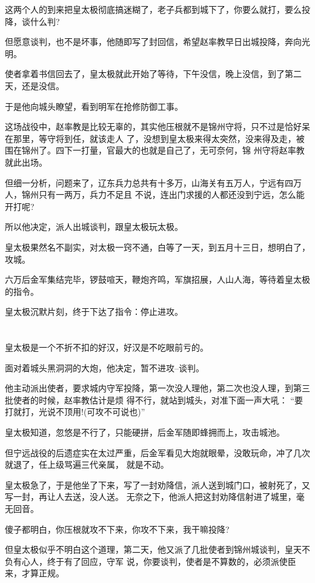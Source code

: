 \documentclass[11pt,a4paper,onecolumn]{article}
\begin{document}
这两个人的到来把皇太极彻底搞迷糊了，老子兵都到城下了，你要么就打，要么投降，谈什么判?

但愿意谈判，也不是坏事，他随即写了封回信，希望赵率教早日出城投降，奔向光明。

使者拿着书信回去了，皇太极就此开始了等待，下午没信，晚上没信，到了第二天，还是没信。

于是他向城头瞭望，看到明军在抢修防御工事。

这场战役中，赵率教是比较无辜的，其实他压根就不是锦州守将，只不过是恰好呆在那里，等守将到任，就该走人
了，没想到皇太极来得太突然，没来得及走，被围在锦州了。四下一打量，官最大的也就是自己了，无可奈何，锦
州守将赵率教就此出场。

但细一分析，问题来了，辽东兵力总共有十多万，山海关有五万人，宁远有四万人，锦州只有一两万，兵力不足且
不说，连出门求援的人都还没到宁远，怎么能开打呢?

所以他决定，派人出城谈判，跟皇太极玩太极。

皇太极果然名不副实，对太极一窍不通，白等了一天，到五月十三日，想明白了，攻城。

六万后金军集结完毕，锣鼓喧天，鞭炮齐鸣，军旗招展，人山人海，等待着皇太极的指令。

皇太极沉默片刻，终于下达了指令：停止进攻。

\section[\thesection]{}

皇太极是一个不折不扣的好汉，好汉是不吃眼前亏的。

面对着城头黑洞洞的大炮，他决定，暂不进攻--谈判。

他主动派出使者，要求城内守军投降，第一次没人理他，第二次也没人理，到第三批使者的时候，赵率教估计是烦
得不行，就站到城头，对准下面一声大吼： ``要打就打，光说不顶用!(可攻不可说也)''

皇太极知道，忽悠是不行了，只能硬拼，后金军随即蜂拥而上，攻击城池。

但宁远战役的后遗症实在太过严重，后金军看见大炮就眼晕，没敢玩命，冲了几次就退了，任上级骂遍三代亲属，
就是不动。

皇太极急了，于是他坐了下来，写了一封劝降信，派人送到城门口，被射死了，又写一封，再让人去送，没人送。
无奈之下，他派人把这封劝降信射进了城里，毫无回音。

傻子都明白，你压根就攻不下来，你攻不下来，我干嘛投降?

但皇太极似乎不明白这个道理，第二天，他又派了几批使者到锦州城谈判，皇天不负有心人，终于有了回应，守军
说，你要谈判，使者是不算数的，必须派使臣来，才算正规。
\end{document}
